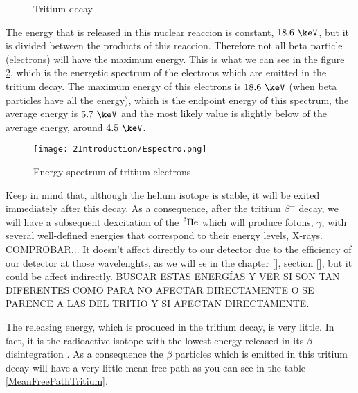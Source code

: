 \begin{figure}[hbtp]
 \centering
 \caption{Tritium decay}
 \label{fig:TritiumDecay}
\end{figure}

The energy that is released in this nuclear reaccion is constant, $18.6~\keV$, but it is divided between the products of this reaccion. Therefore not all beta particle (electrons) will have the maximum energy. This is what we can see in the figure \ref{fig:TritiumDecaySpectrum}, which is the energetic spectrum of the electrons which are emitted in the tritium decay. The maximum energy of this electrons is $18.6~\keV$ (when beta particles have all the energy), which is the endpoint energy of this spectrum, the average energy is $5.7~\keV$ and the most likely value is slightly below of the average energy, around $4.5~\keV$.

\begin{figure}[hbtp]
\texttt{[image: 2Introduction/Espectro.png]}
\centering
\caption{Energy spectrum of tritium electrons ~\cite{TesisTritio}\label{fig:TritiumDecaySpectrum}}
\end{figure}

Keep in mind that, although the helium isotope is stable, it will be exited immediately after this decay. As a consequence, after the tritium $\beta^-$ decay, we will have a subsequent dexcitation of the $\ce{^{3}He}$ which will produce fotons, $\gamma$, with several well-defined energies that correspond to their energy levels, X-rays. COMPROBAR... It doesn't affect directly to our detector due to the efficiency of our detector at those wavelenghts, as we will se in the chapter \ref{}, section \ref{},  but it could be affect indirectly. BUSCAR ESTAS ENERGÍAS Y VER SI SON TAN DIFERENTES COMO PARA NO AFECTAR DIRECTAMENTE O SE PARENCE A LAS DEL TRITIO Y SI AFECTAN DIRECTAMENTE.

The releasing energy, which is produced in the tritium decay, is very little. In fact, it is the radioactive isotope with the lowest energy released in its $\beta$ disintegration \cite{TritiumHandling}. As a consequence the $\beta$ particles which is emitted in this tritium decay will have a very little mean free path as you can see in the table \ref{MeanFreePathTritium}.

